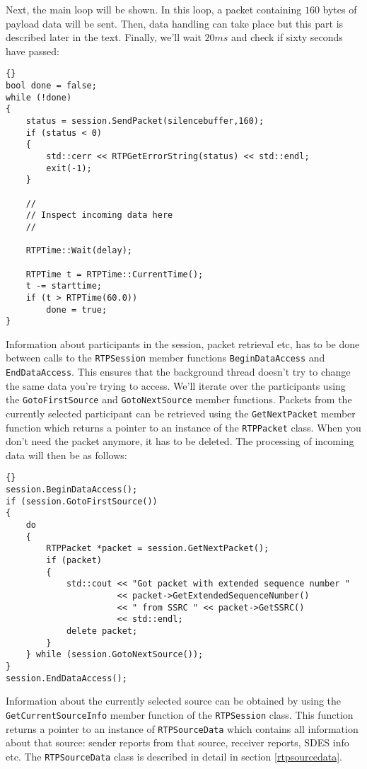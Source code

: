 \documentclass[12pt,a4paper]{article}
\begin{document}
			Next, the main loop will be shown. In this loop, a packet containing
			$160$ bytes of payload data will be sent. Then, data handling can
			take place but this part is described later in the text. Finally,
			we'll wait $20 ms$ and check if sixty seconds have passed:
			\begin{lstlisting}[frame=tb]{}
bool done = false;
while (!done)
{
	status = session.SendPacket(silencebuffer,160);
	if (status < 0)
	{
		std::cerr << RTPGetErrorString(status) << std::endl;
		exit(-1);
	}
	
	//
	// Inspect incoming data here
	//
	
	RTPTime::Wait(delay);
	
	RTPTime t = RTPTime::CurrentTime();
	t -= starttime;
	if (t > RTPTime(60.0))
		done = true;
}
			\end{lstlisting}

			Information about participants in the session, packet retrieval
			etc, has to be done between calls to the {\tt RTPSession} member
			functions {\tt BeginDataAccess} and {\tt EndDataAccess}. This
			ensures that the background thread doesn't try to change the same
			data you're trying to access. We'll iterate over the participants
			using the {\tt GotoFirstSource} and {\tt GotoNextSource} member
			functions. Packets from the currently selected participant can
			be retrieved using the {\tt GetNextPacket} member function which
			returns a pointer to an instance of the {\tt RTPPacket} class.
			When you don't need the packet anymore, it has to be deleted. The
			processing of incoming data will then be as follows:
			\begin{lstlisting}[frame=tb]{}
session.BeginDataAccess();
if (session.GotoFirstSource())
{
	do
	{
		RTPPacket *packet = session.GetNextPacket();
		if (packet)
		{
			std::cout << "Got packet with extended sequence number " 
			          << packet->GetExtendedSequenceNumber() 
					  << " from SSRC " << packet->GetSSRC() 
					  << std::endl;
			delete packet;
		}
	} while (session.GotoNextSource());
}
session.EndDataAccess();
			\end{lstlisting}
			
			Information about the currently selected source can be obtained
			by using the {\tt GetCurrentSourceInfo} member function of 
			the {\tt RTPSession} class. This function returns a pointer to 
			an instance of {\tt RTPSourceData} which contains all information
			about that source: sender reports from that source, receiver
			reports, SDES info etc. The {\tt RTPSourceData} class is described
			in detail in section \ref{rtpsourcedata}.
\end{document}
